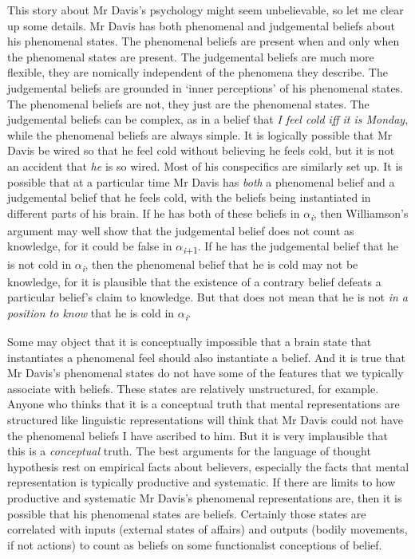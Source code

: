 This story about Mr Davis's psychology might seem unbelievable, so let me clear up some details. Mr Davis has both phenomenal and judgemental beliefs about his phenomenal states. The phenomenal beliefs are present when and only when the phenomenal states are present. The judgemental beliefs are much more flexible, they are nomically independent of the phenomena they describe. The judgemental beliefs are grounded in `inner perceptions' of his phenomenal states. The phenomenal beliefs are not, they just are the phenomenal states. The judgemental beliefs can be complex, as in a belief that \textit{I feel cold iff it is Monday}, while the phenomenal beliefs are always simple. It is logically possible that Mr Davis be wired so that he feel cold without believing he feels cold, but it is not an accident that \textit{he} is so wired. Most of his conspecifics are similarly set up. It is possible that at a particular time Mr Davis has \textit{both} a phenomenal belief and a judgemental belief that he feels cold, with the beliefs being instantiated in different parts of his brain. If he has both of these beliefs in ${\alpha}$\textit{\textsubscript{i}}, then Williamson's argument may well show that the judgemental belief does not count as knowledge, for it could be false in ${\alpha}$\textit{\textsubscript{i}}\textsubscript{+1}. If he has the judgemental belief that he is not cold in ${\alpha}$\textit{\textsubscript{i}}, then the phenomenal belief that he is cold may not be knowledge, for it is plausible that the existence of a contrary belief defeats a particular belief's claim to knowledge. But that does not mean that he is not \textit{in a position to know} that he is cold in ${\alpha}$\textit{\textsubscript{i}}.

Some may object that it is conceptually impossible that a brain state that instantiates a phenomenal feel should also instantiate a belief. And it is true that Mr Davis's phenomenal states do not have some of the features that we typically associate with beliefs. These states are relatively unstructured, for example. Anyone who thinks that it is a conceptual truth that mental representations are structured like linguistic representations will think that Mr Davis could not have the phenomenal beliefs I have ascribed to him. But it is very implausible that this is a \textit{conceptual} truth. The best arguments for the language of thought hypothesis rest on empirical facts about believers, especially the facts that mental representation is typically productive and systematic. If there are limits to how productive and systematic Mr Davis's phenomenal representations are, then it is possible that his phenomenal states are beliefs. Certainly those states are correlated with inputs (external states of affairs) and outputs (bodily movements, if not actions) to count as beliefs on some functionalist conceptions of belief.

